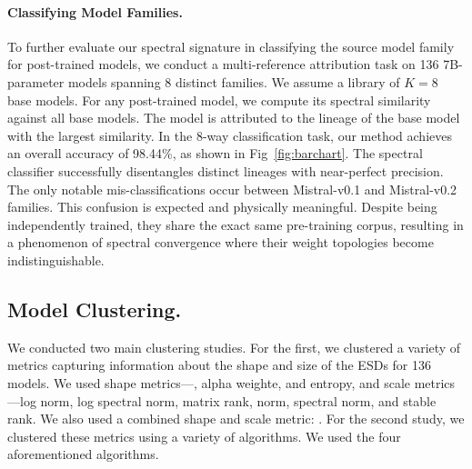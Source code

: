 \paragraph{Classifying Model Families.}
To further evaluate our spectral signature in classifying the source model family for post-trained models, we conduct a multi-reference attribution task on 136 7B-parameter models spanning 8 distinct families. We assume a library of $K=8$ base models. For any post-trained model, we compute its spectral similarity against all base models. The model is attributed to the lineage of the base model with the largest similarity. 
In the 8-way classification task, our method achieves an overall accuracy of 98.44\%, as shown in Fig~\ref{fig:barchart}. The spectral classifier successfully disentangles distinct lineages with near-perfect precision. The only notable mis-classifications occur between Mistral-v0.1 and Mistral-v0.2 families. This confusion is expected and physically meaningful. Despite being independently trained, they share the exact same pre-training corpus, resulting in a phenomenon of spectral convergence where their weight topologies become indistinguishable.




\subsection{Model Clustering.}\label{sec:cluster}  
We conducted two main clustering studies. For the first, we clustered a variety of metrics capturing information about the shape and size of the ESDs for 136 models. We used shape metrics—\ALPHAHILL, alpha weighte, and entropy, and scale metrics—log norm, log spectral norm, matrix rank, norm, spectral norm, and stable rank. We also used a combined shape and scale metric: \LOGALPHANORM. For the second study, we clustered these metrics using a variety of algorithms. We used the four aforementioned algorithms.


